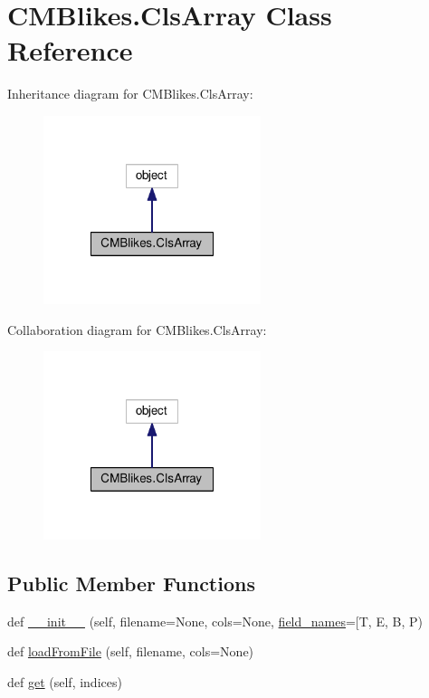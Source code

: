 \hypertarget{classCMBlikes_1_1ClsArray}{}\section{C\+M\+Blikes.\+Cls\+Array Class Reference}
\label{classCMBlikes_1_1ClsArray}


Inheritance diagram for C\+M\+Blikes.\+Cls\+Array\+:
\nopagebreak
\begin{figure}[H]
\begin{center}
\leavevmode
\includegraphics[width=180pt]{classCMBlikes_1_1ClsArray__inherit__graph}
\end{center}
\end{figure}


Collaboration diagram for C\+M\+Blikes.\+Cls\+Array\+:
\nopagebreak
\begin{figure}[H]
\begin{center}
\leavevmode
\includegraphics[width=180pt]{classCMBlikes_1_1ClsArray__coll__graph}
\end{center}
\end{figure}
\subsection*{Public Member Functions}
\begin{DoxyCompactItemize}
\item 
def \mbox{\hyperlink{classCMBlikes_1_1ClsArray_ada047a96ea77f678d49644d8a3a66ad8}{\+\_\+\+\_\+init\+\_\+\+\_\+}} (self, filename=None, cols=None, \mbox{\hyperlink{classCMBlikes_1_1ClsArray_af8bcb5683fef2fd567b8d0c280d5f77d}{field\+\_\+names}}=\mbox{[}\textquotesingle{}T\textquotesingle{}, E, B, P)
\item 
def \mbox{\hyperlink{classCMBlikes_1_1ClsArray_a8d5595682cfd2e5f4db3d726d50f4505}{load\+From\+File}} (self, filename, cols=None)
\item 
def \mbox{\hyperlink{classCMBlikes_1_1ClsArray_a251f3a02464afa3664bfc493f5c74aa2}{get}} (self, indices)
\end{DoxyCompactItemize}
